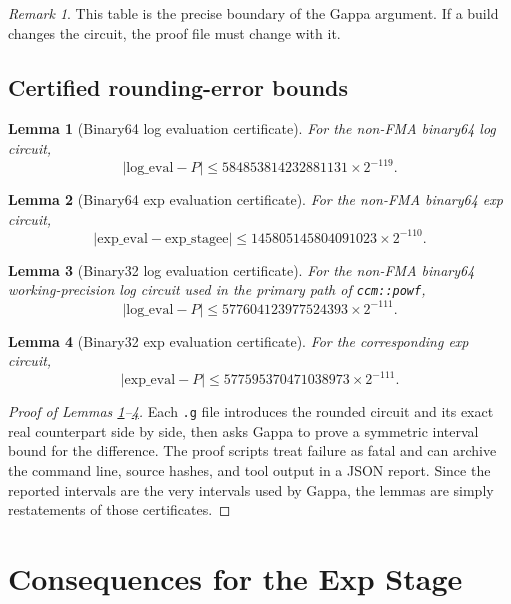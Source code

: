 \documentclass[11pt]{article}
\theoremstyle{plain}
\newtheorem{lemma}{Lemma}
\theoremstyle{remark}
\newtheorem{remark}{Remark}
\newcommand{\Powf}{\texttt{ccm::powf}}
\newcommand{\Gdbl}{145805145804091023 \times 2^{-110}}
\newcommand{\Gflt}{577595370471038973 \times 2^{-111}}
\begin{document}
\begin{remark}
This table is the precise boundary of the Gappa argument.  If a build changes
the circuit, the proof file must change with it.
\end{remark}

\subsection{Certified rounding-error bounds}

\begin{lemma}[Binary64 log evaluation certificate]
\label{lem:gappa-dbl-log}
For the non-FMA binary64 log circuit,
\[
  |\mathrm{log\_eval} - P| \leq 584853814232881131 \times 2^{-119}.
\]
\end{lemma}

\begin{lemma}[Binary64 exp evaluation certificate]
\label{lem:gappa-dbl-exp}
For the non-FMA binary64 exp circuit,
\[
  |\mathrm{exp\_eval} - \mathrm{exp\_stagee}| \leq \Gdbl.
\]
\end{lemma}

\begin{lemma}[Binary32 log evaluation certificate]
\label{lem:gappa-flt-log}
For the non-FMA binary64 working-precision log circuit used in the primary
path of \Powf,
\[
  |\mathrm{log\_eval} - P| \leq 577604123977524393 \times 2^{-111}.
\]
\end{lemma}

\begin{lemma}[Binary32 exp evaluation certificate]
\label{lem:gappa-flt-exp}
For the corresponding exp circuit,
\[
  |\mathrm{exp\_eval} - P| \leq \Gflt.
\]
\end{lemma}

\begin{proof}[Proof of Lemmas \ref{lem:gappa-dbl-log}--\ref{lem:gappa-flt-exp}]
Each \texttt{.g} file introduces the rounded circuit and its exact real
counterpart side by side, then asks Gappa to prove a symmetric interval bound
for the difference.  The proof scripts treat failure as fatal and can archive
the command line, source hashes, and tool output in a JSON report.  Since the
reported intervals are the very intervals used by Gappa, the lemmas are simply
restatements of those certificates.
\end{proof}

\section{Consequences for the Exp Stage}
\label{sec:exp}
\end{document}
